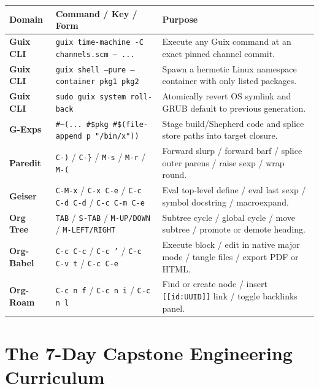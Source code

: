 \documentclass[11pt,oneside]{book}
\begin{document}
\begin{center}
\begin{tabularx}{\textwidth}{llX}
\toprule
\textbf{Domain} & \textbf{Command / Key / Form} & \textbf{Purpose} \\
\midrule
\textbf{Guix CLI} & \texttt{guix time-machine -C channels.scm -- ...} & Execute any Guix command at an exact pinned channel commit. \\
\textbf{Guix CLI} & \texttt{guix shell --pure --container pkg1 pkg2} & Spawn a hermetic Linux namespace container with only listed packages. \\
\textbf{Guix CLI} & \texttt{sudo guix system roll-back} & Atomically revert OS symlink and GRUB default to previous generation. \\
\textbf{G-Exps} & \texttt{\#\textasciitilde(... \#\$pkg \#\$(file-append p "/bin/x"))} & Stage build/Shepherd code and splice store paths into target closure. \\
\textbf{Paredit} & \texttt{C-)} / \texttt{C-\}} / \texttt{M-s} / \texttt{M-r} / \texttt{M-(} & Forward slurp / forward barf / splice outer parens / raise sexp / wrap round. \\
\textbf{Geiser} & \texttt{C-M-x} / \texttt{C-x C-e} / \texttt{C-c C-d C-d} / \texttt{C-c C-m C-e} & Eval top-level define / eval last sexp / symbol docstring / macroexpand. \\
\textbf{Org Tree} & \texttt{TAB} / \texttt{S-TAB} / \texttt{M-UP/DOWN} / \texttt{M-LEFT/RIGHT} & Subtree cycle / global cycle / move subtree / promote or demote heading. \\
\textbf{Org-Babel} & \texttt{C-c C-c} / \texttt{C-c '} / \texttt{C-c C-v t} / \texttt{C-c C-e} & Execute block / edit in native major mode / tangle files / export PDF or HTML. \\
\textbf{Org-Roam} & \texttt{C-c n f} / \texttt{C-c n i} / \texttt{C-c n l} & Find or create node / insert \texttt{[[id:UUID]]} link / toggle backlinks panel. \\
\bottomrule
\end{tabularx}
\end{center}

\section{The 7-Day Capstone Engineering Curriculum}
\end{document}
